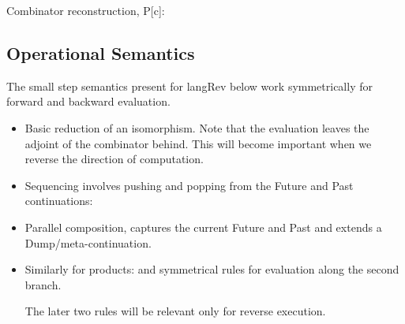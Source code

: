 \documentclass[preprint]{sigplanconf}
\begin{document}
Combinator reconstruction, {{P[c]}}: 

\subsection{Operational Semantics}

The small step semantics present for {{langRev}} below work
symmetrically for forward and backward evaluation.

\begin{itemize}
\item 
Basic reduction of an isomorphism. Note that the evaluation leaves the
adjoint of the combinator behind. This will become important when we
reverse the direction of computation.

\item
Sequencing involves pushing and popping from the Future and Past
continuations:


\item
Parallel composition, captures the current Future and Past and extends
a Dump/meta-continuation.


\item
Similarly for products:
and symmetrical rules for evaluation along the second branch. 

The later two rules will be relevant only for reverse execution. 

\end{itemize}
\end{document}
